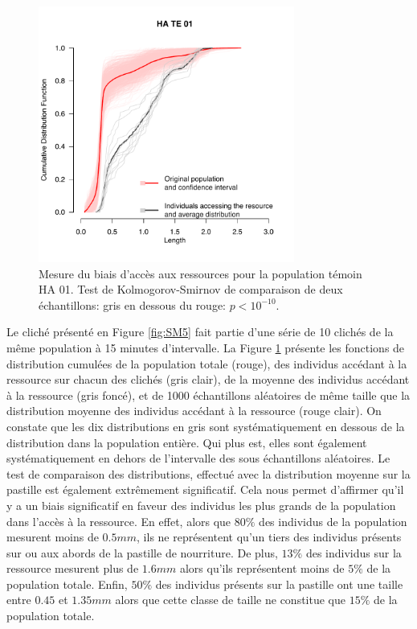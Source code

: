 \begin{figure}[!ht]
\begin{center}
\includegraphics[width=0.75\textwidth]{1_CorpsDeThese/Resumes/Fig/SM06}
\caption[Mesure du biais
d'accès aux ressources]{Mesure du biais
d'accès aux ressources pour la population témoin HA 01. Test de
Kolmogorov-Smirnov de comparaison de deux échantillons: gris en dessous du
rouge: $p<10^{-10}$.}
\label{fig:SM6}
\end{center}
\end{figure}

Le cliché présenté en Figure \ref{fig:SM5} fait partie d'une série de 10 clichés
de la même population à 15 minutes d'intervalle. La Figure \ref{fig:SM6}
présente les fonctions de distribution cumulées de la population totale (rouge),
des individus accédant à la ressource sur chacun des clichés (gris clair), de la
moyenne des individus accédant à la ressource (gris foncé), et de 1000
échantillons aléatoires de même taille que la distribution moyenne des individus
accédant à la ressource (rouge clair). On constate que les dix distributions en
gris sont systématiquement en dessous de la distribution dans la population entière. Qui
plus est, elles sont également systématiquement en dehors de l'intervalle des
sous échantillons aléatoires. Le test de comparaison des distributions,
effectué avec la distribution moyenne sur la pastille est également extrêmement
significatif.
Cela nous permet d'affirmer qu'il y a un biais significatif en faveur des
individus les plus grands de la population dans l'accès à la ressource. En
effet, alors que $80\%$ des individus de la population mesurent moins de
$0.5mm$, ils ne représentent qu'un tiers des individus présents sur ou aux
abords de la pastille de nourriture. De plus, $13\%$ des individus sur la
ressource mesurent plus de $1.6mm$ alors qu'ils représentent moins de $5\%$ de
la population totale. Enfin, $50\%$ des individus présents sur la pastille ont
une taille entre $0.45$ et $1.35mm$ alors que cette classe de taille ne
constitue que $15\%$ de la population totale.

